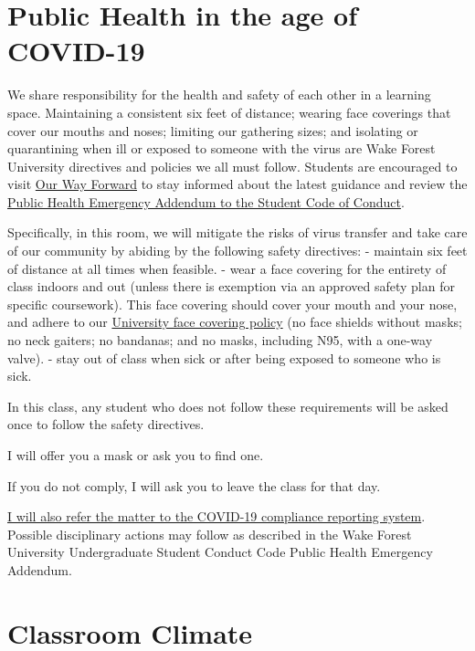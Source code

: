 \documentclass[11pt,]{article}
\begin{document}
\hypertarget{public-health-in-the-age-of-covid-19}{%
\section{Public Health in the age of
COVID-19}\label{public-health-in-the-age-of-covid-19}}

We share responsibility for the health and safety of each other in a
learning space. Maintaining a consistent six feet of distance; wearing
face coverings that cover our mouths and noses; limiting our gathering
sizes; and isolating or quarantining when ill or exposed to someone with
the virus are Wake Forest University directives and policies we all must
follow. Students are encouraged to visit
\href{https://ourwayforward.wfu.edu/}{Our Way Forward} to stay informed
about the latest guidance and review the
\href{https://studentconduct.wfu.edu/undergraduate-student-handbook/public-health-emergency-addendum/}{Public
Health Emergency Addendum to the Student Code of Conduct}.

Specifically, in this room, we will mitigate the risks of virus transfer
and take care of our community by abiding by the following safety
directives: - maintain six feet of distance at all times when feasible.
- wear a face covering for the entirety of class indoors and out (unless
there is exemption via an approved safety plan for specific coursework).
This face covering should cover your mouth and your nose, and adhere to
our
\href{https://drive.google.com/file/d/1Tqo-by1sjmc-kWUTwAqeNdaHq8OBsU9B/view}{University
face covering policy} (no face shields without masks; no neck gaiters;
no bandanas; and no masks, including N95, with a one-way valve). - stay
out of class when sick or after being exposed to someone who is sick.

In this class, any student who does not follow these requirements will
be asked once to follow the safety directives.

I will offer you a mask or ask you to find one.

If you do not comply, I will ask you to leave the class for that day.

\href{https://cm.maxient.com/reportingform.php?WakeForestUniv\&layout_id=40}{I
will also refer the matter to the COVID-19 compliance reporting system}.
Possible disciplinary actions may follow as described in the Wake Forest
University Undergraduate Student Conduct Code Public Health Emergency
Addendum.

\hypertarget{classroom-climate}{%
\section{Classroom Climate}\label{classroom-climate}}
\end{document}
